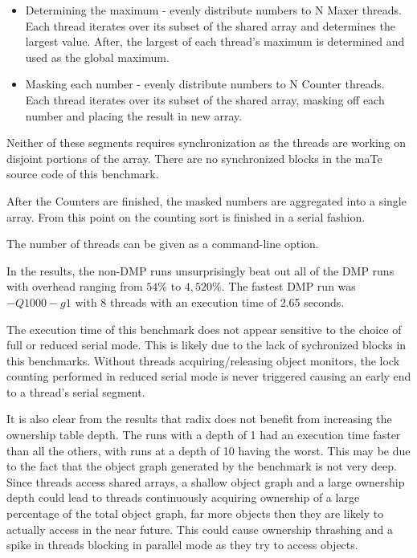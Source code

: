\begin{itemize}
\item Determining the maximum - evenly distribute numbers to N Maxer
  threads.  Each thread iterates over its subset of the shared array
  and determines the largest value.  After, the largest of each
  thread's maximum is determined and used as the global maximum.

\item Masking each number - evenly distribute numbers to N Counter
  threads.  Each thread iterates over its subset of the shared array,
  masking off each number and placing the result in new array.
\end{itemize}

Neither of these segments requires synchronization as the threads are
working on disjoint portions of the array.  There are no synchronized
blocks in the maTe source code of this benchmark.

After the Counters are finished, the masked numbers are aggregated
into a single array.  From this point on the counting sort is finished
in a serial fashion.

The number of threads can be given as a command-line option.

In the results, the non-DMP runs unsurprisingly beat out all of the
DMP runs with overhead ranging from $54\%$ to $4,520\%$.  The fastest
DMP run was $-Q1000 -g1$ with 8 threads with an execution time of 2.65
seconds.

The execution time of this benchmark does not appear sensitive to the
choice of full or reduced serial mode.  This is likely due to the lack
of sychronized blocks in this benchmarks.  Without threads
acquiring/releasing object monitors, the lock counting performed in
reduced serial mode is never triggered causing an early end to a
thread's serial segment.

It is also clear from the results that radix does not benefit from
increasing the ownership table depth.  The runs with a depth of 1 had
an execution time faster than all the others, with runs at a depth of
10 having the worst.  This may be due to the fact that the object
graph generated by the benchmark is not very deep.  Since threads
access shared arrays, a shallow object graph and a large ownership
depth could lead to threads continuously acquiring ownership of a
large percentage of the total object graph, far more objects then they
are likely to actually access in the near future.  This could cause
ownership thrashing and a spike in threads blocking in parallel mode
as they try to access objects.

